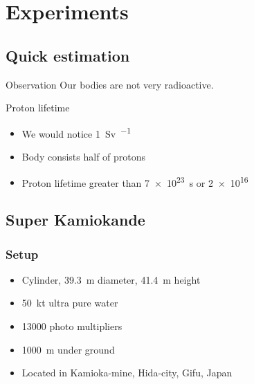 \documentclass[english, fleqn]{beamer}
\begin{document}
\section{Experiments}

\subsection{Quick estimation}

\begin{frame}
    \begin{block}{Observation}
        Our bodies are not very radioactive.
    \end{block}

    \pause

    \begin{block}{Proton lifetime}
        \begin{itemize}
            \item We would notice \SI{1}{\sievert\per\year}
            \item Body consists half of protons
            \item Proton lifetime greater than \SI{7e23}{\second} or \SI{2e16}{\year}
        \end{itemize}
    \end{block}

    \nocite{wikipedia/groessenordnung-aequivalentdosis}
\end{frame}

\subsection{Super Kamiokande}

\begin{frame}
    \frametitle{Setup}

    \begin{itemize}
        \item Cylinder, \SI{39.3}{\meter} diameter, \SI{41.4}{\meter} height
        \item \SI{50}{\kilo\tonne} ultra pure water
        \item \num{13000} photo multipliers
        \item \SI{1000}{\meter} under ground
        \item Located in Kamioka-mine, Hida-city, Gifu, Japan
    \end{itemize}

\end{frame}
\end{document}
